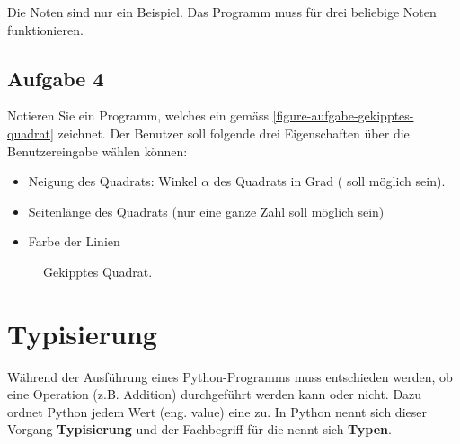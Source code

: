 Die Noten sind nur ein Beispiel. Das Programm muss für drei beliebige Noten funktionieren.

\fillwithgrid{2.5in}

\subsection{Aufgabe 4}

Notieren Sie ein Programm, welches ein  gemäss \autoref{figure-aufgabe-gekipptes-quadrat} zeichnet. Der Benutzer soll folgende drei Eigenschaften über die Benutzereingabe wählen können:

\begin{itemize}
\item Neigung des Quadrats: Winkel $\alpha$ des Quadrats in Grad ( soll möglich sein).
\item Seitenlänge des Quadrats (nur eine ganze Zahl soll möglich sein)
\item Farbe der Linien
\end{itemize}

\begin{figure}[htb]
\centering
\begin{minipage}{0.65\textwidth}
\centering
\fillwithgrid{2.5in}
\end{minipage}
\hfill
\begin{minipage}{0.3\textwidth}
\centering
{}
\caption{Gekipptes Quadrat.}
\label{figure-aufgabe-gekipptes-quadrat}
\end{minipage}
\end{figure}

\section{Typisierung}

Während der Ausführung eines Python-Programms muss entschieden werden, ob eine Operation (z.B. Addition) durchgeführt werden kann oder nicht. Dazu ordnet Python jedem Wert (eng. value) eine  zu. In Python nennt sich dieser Vorgang \textbf{Typisierung} und der Fachbegriff für die  nennt sich \textbf{Typen}.

